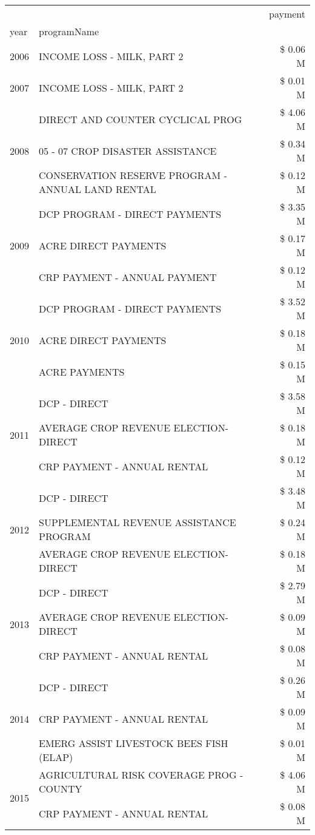 \begin{tabular}{llr}
\toprule
 &  & payment \\
year & programName &  \\
\midrule
2006 & INCOME LOSS - MILK, PART 2 & \$ 0.06 M \\
\cline{1-3}
2007 & INCOME LOSS - MILK, PART 2 & \$ 0.01 M \\
\cline{1-3}
\multirow[t]{3}{*}{2008} & DIRECT AND COUNTER CYCLICAL PROG & \$ 4.06 M \\
 & 05 - 07 CROP DISASTER ASSISTANCE & \$ 0.34 M \\
 & CONSERVATION RESERVE PROGRAM - ANNUAL LAND RENTAL & \$ 0.12 M \\
\cline{1-3}
\multirow[t]{3}{*}{2009} & DCP PROGRAM - DIRECT PAYMENTS & \$ 3.35 M \\
 & ACRE DIRECT PAYMENTS & \$ 0.17 M \\
 & CRP PAYMENT - ANNUAL PAYMENT & \$ 0.12 M \\
\cline{1-3}
\multirow[t]{3}{*}{2010} & DCP PROGRAM - DIRECT PAYMENTS & \$ 3.52 M \\
 & ACRE DIRECT PAYMENTS & \$ 0.18 M \\
 & ACRE PAYMENTS & \$ 0.15 M \\
\cline{1-3}
\multirow[t]{3}{*}{2011} & DCP - DIRECT & \$ 3.58 M \\
 & AVERAGE CROP REVENUE ELECTION-DIRECT & \$ 0.18 M \\
 & CRP PAYMENT - ANNUAL RENTAL & \$ 0.12 M \\
\cline{1-3}
\multirow[t]{3}{*}{2012} & DCP - DIRECT & \$ 3.48 M \\
 & SUPPLEMENTAL REVENUE ASSISTANCE PROGRAM & \$ 0.24 M \\
 & AVERAGE CROP REVENUE ELECTION-DIRECT & \$ 0.18 M \\
\cline{1-3}
\multirow[t]{3}{*}{2013} & DCP - DIRECT & \$ 2.79 M \\
 & AVERAGE CROP REVENUE ELECTION-DIRECT & \$ 0.09 M \\
 & CRP PAYMENT - ANNUAL RENTAL & \$ 0.08 M \\
\cline{1-3}
\multirow[t]{3}{*}{2014} & DCP - DIRECT & \$ 0.26 M \\
 & CRP PAYMENT - ANNUAL RENTAL & \$ 0.09 M \\
 & EMERG ASSIST LIVESTOCK BEES FISH (ELAP) & \$ 0.01 M \\
\cline{1-3}
\multirow[t]{3}{*}{2015} & AGRICULTURAL RISK COVERAGE PROG - COUNTY & \$ 4.06 M \\
 & CRP PAYMENT - ANNUAL RENTAL & \$ 0.08 M \\

\end{tabular}
